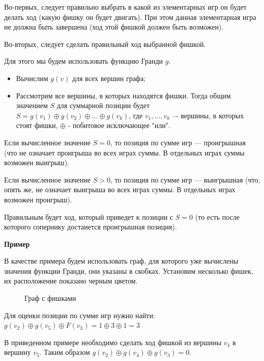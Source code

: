 \documentclass[12pt, letterpaper, titlepage]{article}
\begin{document}
Во-первых, следует правильно выбрать в какой из элементарных игр он будет делать ход (какую фишку он будет двигать). При этом данная элементарная игра не должна быть завершена (ход этой фишкой должен быть возможен).

Во-вторых, следует сделать правильный ход выбранной фишкой.

Для этого мы будем использовать функцию Гранди $g$.
\begin{itemize}
    \item Вычислим $g(v)$ для всех вершин графа;
    \item Рассмотрим все вершины, в которых находятся фишки. Тогда общим значением $S$ для суммарной позиции будет  $S = g(v_1) \oplus g(v_2) \oplus \dots \oplus g(v_k)$, где $v_1, \dots, v_k$ –- вершины, в которых стоят фишки, $\oplus$ - побитовое исключающее "или".
\end{itemize}


Если вычисленное значение $S = 0$, то позиция по сумме игр — проигрышная (что не означает проигрыша во всех играх суммы. В отдельных играх суммы возможен выигрыш).

Если вычисленное значение $S > 0$, то позиция по сумме игр — выигрышная (что, опять же, не означает выигрыша во всех играх суммы. В отдельных играх возможен проигрыш).

Правильным будет ход, который приведет к позиции с $S = 0$ (то есть после которого сопернику достанется проигрышная позиция).

\textbf{Пример}

В качестве примера будем использовать граф, для которого уже вычислены значения функции Гранди, они указаны в скобках. Установим несколько фишек, их расположение показано черным цветом.

\begin{figure}[H]\centering\caption{Граф с фишками}\end{figure}

Для оценки позиции по сумме игр нужно найти:
$g(v_2) \oplus g(v_5) \oplus F(v_3) = 1 \oplus 3 \oplus 1 = 3$

В приведенном примере необходимо сделать ход фишкой из вершины $v_4$ в вершину $v_5$. Таким образом $g(v_2) \oplus g(v_4) \oplus g(v_3) = 0$.
\end{document}
